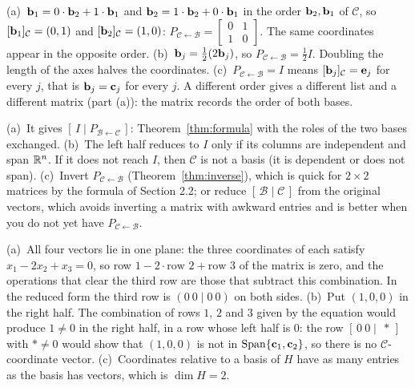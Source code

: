 \documentclass[11pt]{article}
\begin{document}
\begin{description}[leftmargin=0pt,itemsep=5pt]
  \item[Pause and think \ref{think:special}.] (a)~$\mathbf{b}_1=0\cdot\mathbf{b}_2+1\cdot\mathbf{b}_1$ and $\mathbf{b}_2=1\cdot\mathbf{b}_2+0\cdot\mathbf{b}_1$ in the order $\mathbf{b}_2,\mathbf{b}_1$ of $\mathcal{C}$, so $[\mathbf{b}_1]_{\mathcal{C}}=(0,1)$ and $[\mathbf{b}_2]_{\mathcal{C}}=(1,0)$: $P_{\mathcal{C}\leftarrow\mathcal{B}}=\begin{bmatrix}0&1\\1&0\end{bmatrix}$. The same coordinates appear in the opposite order. (b)~$\mathbf{b}_j=\tfrac12(2\mathbf{b}_j)$, so $P_{\mathcal{C}\leftarrow\mathcal{B}}=\tfrac12I$. Doubling the length of the axes halves the coordinates. (c)~$P_{\mathcal{C}\leftarrow\mathcal{B}}=I$ means $[\mathbf{b}_j]_{\mathcal{C}}=\mathbf{e}_j$ for every $j$, that is $\mathbf{b}_j=\mathbf{c}_j$ for every $j$. A different order gives a different list and a different matrix (part (a)): the matrix records the order of both bases.
  \item[Pause and think \ref{think:direction}.] (a)~It gives $[\,I\mid P_{\mathcal{B}\leftarrow\mathcal{C}}\,]$: Theorem~\ref{thm:formula} with the roles of the two bases exchanged. (b)~The left half reduces to $I$ only if its columns are independent and span $\mathbb{R}^n$. If it does not reach $I$, then $\mathcal{C}$ is not a basis (it is dependent or does not span). (c)~Invert $P_{\mathcal{C}\leftarrow\mathcal{B}}$ (Theorem~\ref{thm:inverse}), which is quick for $2\times2$ matrices by the formula of Section 2.2; or reduce $[\,\mathcal{B}\mid\mathcal{C}\,]$ from the original vectors, which avoids inverting a matrix with awkward entries and is better when you do not yet have $P_{\mathcal{C}\leftarrow\mathcal{B}}$.
  \item[Pause and think \ref{think:zerorow}.] (a)~All four vectors lie in one plane: the three coordinates of each satisfy $x_1-2x_2+x_3=0$, so row $1-2\cdot\text{row }2+\text{row }3$ of the matrix is zero, and the operations that clear the third row are those that subtract this combination. In the reduced form the third row is $(0\ 0\mid 0\ 0)$ on both sides. (b)~Put $(1,0,0)$ in the right half. The combination of rows $1$, $2$ and $3$ given by the equation would produce $1\neq0$ in the right half, in a row whose left half is $0$: the row $[\,0\ 0\mid\ \ast\,]$ with $\ast\neq0$ would show that $(1,0,0)$ is not in $\operatorname{Span}\{\mathbf{c}_1,\mathbf{c}_2\}$, so there is no $\mathcal{C}$-coordinate vector. (c)~Coordinates relative to a basis of $H$ have as many entries as the basis has vectors, which is $\dim H=2$.

\end{description}
\end{document}
